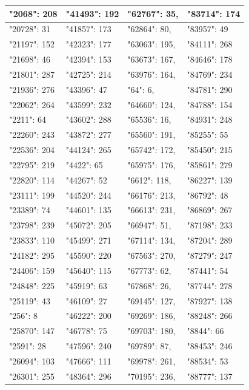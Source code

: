 \documentclass[11pt,letterpaper]{article}
\begin{document}
\begin{enumerate}[label=\alph*)]
\begin{itemize}
\begin{table}[H]
\begin{longtable}{|l|l|l|l|}
"2068":  208 & "41493": 192 & "62767": 35, & "83714": 174 \\ \hline
"20728": 31 & "41857": 173 & "62864": 80, & "83957": 49 \\ \hline
"21197": 152 & "42323": 177 & "63063": 195, & "84111": 268 \\ \hline
"21698": 46 & "42394": 153 & "63673": 167, & "84646": 178 \\ \hline
"21801": 287 & "42725": 214 & "63976": 164, & "84769": 234 \\ \hline
"21936": 276 & "43396": 47 & "64": 6, & "84781": 290 \\ \hline
"22062": 264 & "43599": 232 & "64660": 124, & "84788": 154 \\ \hline
"2211":  64 & "43602": 288 & "65536": 16, & "84931": 248 \\ \hline
"22260": 243 & "43872": 277 & "65560": 191, & "85255": 55 \\ \hline
"22536": 204 & "44124": 265 & "65742": 172, & "85450": 215 \\ \hline
"22795": 219 & "4422": 65 & "65975": 176, & "85861": 279 \\ \hline
"22820": 114 & "44267": 52 & "6612": 118, & "86227": 139 \\ \hline
"23111": 199 & "44520": 244 & "66176": 213, & "86792": 48 \\ \hline
"23389": 74 & "44601": 135 & "66613": 231, & "86869": 267 \\ \hline
"23798": 239 & "45072": 205 & "66947": 51, & "87198": 233 \\ \hline
"23833": 110 & "45499": 271 & "67114": 134, & "87204": 289 \\ \hline
"24182": 295 & "45590": 220 & "67563": 270, & "87279": 247 \\ \hline
"24406": 159 & "45640": 115 & "67773": 62, & "87441": 54 \\ \hline
"24848": 225 & "45919": 63 & "67868": 26, & "87744": 278 \\ \hline
"25119": 43 & "46109": 27 & "69145": 127, & "87927": 138 \\ \hline
"256":   8 & "46222": 200 & "69269": 186, & "88248": 266 \\ \hline
"25870": 147 & "46778": 75 & "69703": 180, & "8844": 66 \\ \hline
"2591":  28 & "47596": 240 & "69789": 87, & "88453": 246 \\ \hline
"26094": 103 & "47666": 111 & "69978": 261, & "88534": 53 \\ \hline
"26301": 255 & "48364": 296 & "70195": 236, & "88777": 137 \\ \hline

\end{longtable}
\end{table}
\end{itemize}
\end{enumerate}
\end{document}
